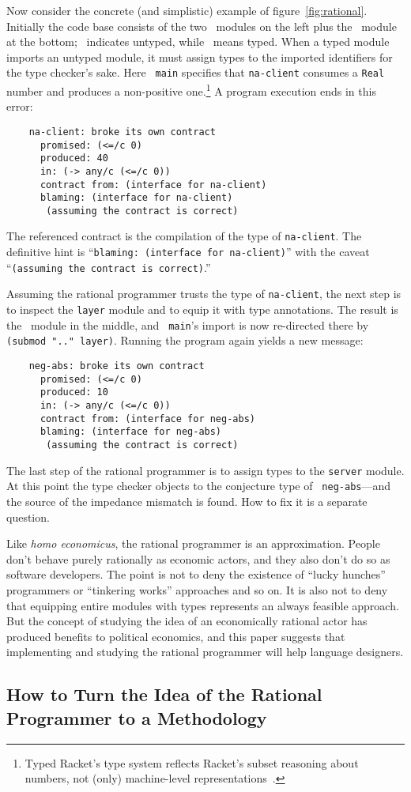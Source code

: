 Now consider the concrete (and simplistic) example of figure~\ref{fig:rational}.
Initially the code base consists of the two \dyncolor\ modules on the left plus
the \typecolor\ module at the bottom; \dyncolor\ indicates untyped, while
\typecolor\ means typed. When a typed module imports an untyped module, it must
assign types to the imported identifiers for the type checker's sake. Here {\tt
main} specifies that {\tt na-client} consumes a {\tt Real} number and produces a
non-positive one.\footnote{Typed Racket's type system reflects Racket's subset
reasoning about numbers, not (only) machine-level
representations~\cite{stathff-padl-12}.} A program execution ends in this error:
\begin{verbatim}
    na-client: broke its own contract
      promised: (<=/c 0)
      produced: 40
      in: (-> any/c (<=/c 0))           
      contract from: (interface for na-client)
      blaming: (interface for na-client)
       (assuming the contract is correct)
\end{verbatim}
The referenced contract is the compilation of the type of {\tt na-client}. The
definitive hint is ``{\tt blaming: (interface for na-client)}'' with the caveat
``{\tt (assuming the contract is correct)}.''

Assuming the rational programmer trusts the type of {\tt na-client}, the next
step is to inspect the {\tt layer} module and to equip it with type
annotations. The result is the \typecolor\ module in the middle, and {\tt
main}'s import is now re-directed there by {\tt (submod ".." layer)}. Running the
program again yields a new message:
\begin{verbatim}
    neg-abs: broke its own contract
      promised: (<=/c 0)
      produced: 10
      in: (-> any/c (<=/c 0))
      contract from: (interface for neg-abs)
      blaming: (interface for neg-abs)
       (assuming the contract is correct)
\end{verbatim}
The last step of the rational programmer is to assign types to the {\tt server}
module. At this point the type checker objects to the conjecture type of {\tt
neg-abs}---and the source of the impedance mismatch is found. How to fix it is a
separate question.

Like {\it homo economicus\/}, the rational programmer is an
approximation.  People don't behave purely rationally as economic
actors, and they also don't do so as software developers. The point is
not to deny the existence of ``lucky hunches'' programmers or
``tinkering works'' approaches and so on. It is also not to deny that
equipping entire modules with types represents an always feasible
approach.  But the concept of studying the idea of an economically
rational actor has produced benefits to political economics, and this
paper suggests that implementing and studying the rational programmer
will help language designers.

\subsection{How to Turn the Idea of the Rational Programmer to a Methodology}


